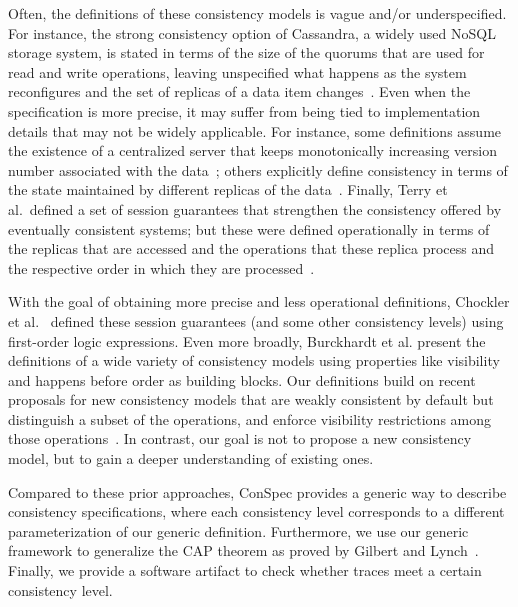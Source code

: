 \documentclass[acmlarge, ,11pt]{acmart}
\begin{document}
Often, the definitions of these consistency models is vague and/or underspecified. For instance, the strong consistency option of Cassandra, a widely used NoSQL storage system, is stated in terms of the size of the quorums that are used for read and write operations, leaving unspecified what happens as the system reconfigures and the set of replicas of a data item changes~\cite{cassandra-consistency}.
Even when the specification is more precise, it may suffer from being tied to implementation details that may not be widely applicable. For instance, some definitions assume the existence of a centralized server that keeps monotonically increasing version number associated with the data~\cite{DBLP:conf/icde/AdyaLO00}; others explicitly define consistency in terms of the state maintained by different replicas of the data~\cite{Li:2012:MGS:2387880.2387906}. Finally, Terry et al.\ defined a set of session guarantees that strengthen the consistency offered by eventually consistent systems; but these were defined operationally in terms of the replicas that are accessed and the operations that these replica process and the respective order in which they are processed~\cite{bayou}.

With the goal of obtaining more precise and less operational definitions,
Chockler et al.~\cite{Chockler2000} defined these session guarantees (and some other consistency levels) using first-order logic expressions.
Even more broadly, Burckhardt et al. \cite{Burckhardt:2014:PEC:2693641.2693642} present the definitions of a wide variety of consistency models using properties like visibility and happens before order as building blocks.  Our definitions build on recent proposals for new consistency models that are weakly consistent by default but distinguish a subset of the operations, and enforce visibility restrictions among those operations~\cite{Li:2012:MGS:2387880.2387906, Gotsman:2016:CIS:2837614.2837625, cheng-papoc}. In contrast, our goal is not to propose a new consistency model, but to gain a deeper understanding of existing ones.

Compared to these prior approaches, ConSpec provides a generic way to describe consistency specifications, where each consistency level corresponds to a different parameterization of our generic definition. Furthermore, we use our generic framework to generalize the CAP theorem as proved by Gilbert and Lynch~\cite{Gilbert:2002:BCF:564585.564601}. Finally, we provide a software artifact to check whether traces meet a certain consistency level.
\end{document}

